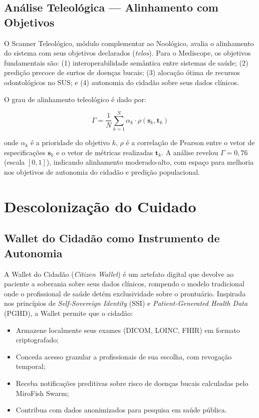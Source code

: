 \subsection{Análise Teleológica --- Alinhamento com Objetivos}

O Scanner Teleológico, módulo complementar ao Noológico, avalia o alinhamento do sistema com seus objetivos declarados (\textit{telos}). Para o Mediscope, os objetivos fundamentais são: (1) interoperabilidade semântica entre sistemas de saúde; (2) predição precoce de surtos de doenças bucais; (3) alocação ótima de recursos odontológicos no SUS; e (4) autonomia do cidadão sobre seus dados clínicos.

O grau de alinhamento teleológico é dado por:

\begin{equation}
\Gamma = \frac{1}{N} \sum_{k=1}^N \alpha_k \cdot \rho(\mathbf{s}_k, \mathbf{t}_k)
\label{eq:teleological}
\end{equation}

onde $\alpha_k$ é a prioridade do objetivo $k$, $\rho$ é a correlação de Pearson entre o vetor de especificações $\mathbf{s}_k$ e o vetor de métricas realizadas $\mathbf{t}_k$. A análise revelou $\Gamma = 0{,}76$ (escala $[0,1]$), indicando alinhamento moderado-alto, com espaço para melhoria nos objetivos de autonomia do cidadão e predição populacional.

\section{Descolonização do Cuidado}

\subsection{Wallet do Cidadão como Instrumento de Autonomia}

A Wallet do Cidadão (\textit{Citizen Wallet}) é um artefato digital que devolve ao paciente a soberania sobre seus dados clínicos, rompendo o modelo tradicional onde o profissional de saúde detém exclusividade sobre o prontuário. Inspirada nos princípios de \textit{Self-Sovereign Identity} (SSI) e \textit{Patient-Generated Health Data} (PGHD), a Wallet permite que o cidadão:

\begin{itemize}
    \item Armazene localmente seus exames (DICOM, LOINC, FHIR) em formato criptografado;
    \item Conceda acesso granular a profissionais de sua escolha, com revogação temporal;
    \item Receba notificações preditivas sobre risco de doenças bucais calculadas pelo MiroFish Swarm;
    \item Contribua com dados anonimizados para pesquisa em saúde pública.
\end{itemize}

